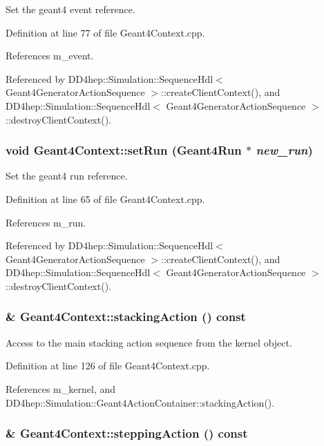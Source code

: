 Set the geant4 event reference. 

Definition at line 77 of file Geant4Context.cpp.

References m\_\-event.

Referenced by DD4hep::Simulation::SequenceHdl$<$ Geant4GeneratorActionSequence $>$::createClientContext(), and DD4hep::Simulation::SequenceHdl$<$ Geant4GeneratorActionSequence $>$::destroyClientContext().\hypertarget{class_d_d4hep_1_1_simulation_1_1_geant4_context_a31bdc70c285a758ad7563d5c54a5072a}{
\subsubsection[{setRun}]{\setlength{\rightskip}{0pt plus 5cm}void Geant4Context::setRun ({\bf Geant4Run} $\ast$ {\em new\_\-run})}}
\label{class_d_d4hep_1_1_simulation_1_1_geant4_context_a31bdc70c285a758ad7563d5c54a5072a}


Set the geant4 run reference. 

Definition at line 65 of file Geant4Context.cpp.

References m\_\-run.

Referenced by DD4hep::Simulation::SequenceHdl$<$ Geant4GeneratorActionSequence $>$::createClientContext(), and DD4hep::Simulation::SequenceHdl$<$ Geant4GeneratorActionSequence $>$::destroyClientContext().\hypertarget{class_d_d4hep_1_1_simulation_1_1_geant4_context_aedd2b364c13faaf80b4ecfb9ceefefb0}{
\subsubsection[{stackingAction}]{ \& Geant4Context::stackingAction () const}}
\label{class_d_d4hep_1_1_simulation_1_1_geant4_context_aedd2b364c13faaf80b4ecfb9ceefefb0}


Access to the main stacking action sequence from the kernel object. 

Definition at line 126 of file Geant4Context.cpp.

References m\_\-kernel, and DD4hep::Simulation::Geant4ActionContainer::stackingAction().\hypertarget{class_d_d4hep_1_1_simulation_1_1_geant4_context_af1f076268388a8bb73914eec7f166809}{
\subsubsection[{steppingAction}]{ \& Geant4Context::steppingAction () const}}
\label{class_d_d4hep_1_1_simulation_1_1_geant4_context_af1f076268388a8bb73914eec7f166809}


